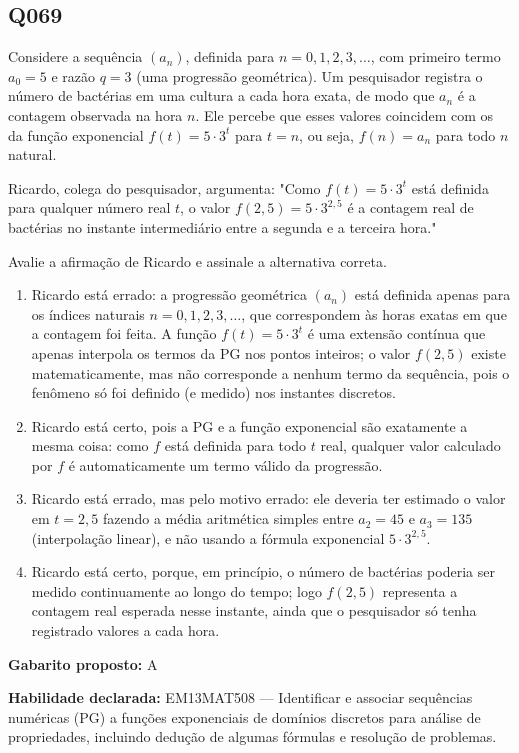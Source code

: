 \documentclass[11pt,a4paper]{article}
\begin{document}
\begin{samepage}
\subsection*{Q069}
Considere a sequência $(a_n)$, definida para $n = 0, 1, 2, 3, \ldots$, com primeiro termo $a_0 = 5$ e razão $q = 3$ (uma progressão geométrica). Um pesquisador registra o número de bactérias em uma cultura a cada hora exata, de modo que $a_n$ é a contagem observada na hora $n$. Ele percebe que esses valores coincidem com os da função exponencial $f(t) = 5 \cdot 3^t$ para $t = n$, ou seja, $f(n) = a_n$ para todo $n$ natural.

Ricardo, colega do pesquisador, argumenta: "Como $f(t)=5\cdot 3^t$ está definida para qualquer número real $t$, o valor $f(2{,}5) = 5\cdot 3^{2{,}5}$ é a contagem real de bactérias no instante intermediário entre a segunda e a terceira hora."

Avalie a afirmação de Ricardo e assinale a alternativa correta.
\begin{enumerate}[label=(\alph*),nosep,leftmargin=*]
\item Ricardo está errado: a progressão geométrica $(a_n)$ está definida apenas para os índices naturais $n=0,1,2,3,\ldots$, que correspondem às horas exatas em que a contagem foi feita. A função $f(t)=5\cdot3^t$ é uma extensão contínua que apenas interpola os termos da PG nos pontos inteiros; o valor $f(2{,}5)$ existe matematicamente, mas não corresponde a nenhum termo da sequência, pois o fenômeno só foi definido (e medido) nos instantes discretos.
\item Ricardo está certo, pois a PG e a função exponencial são exatamente a mesma coisa: como $f$ está definida para todo $t$ real, qualquer valor calculado por $f$ é automaticamente um termo válido da progressão.
\item Ricardo está errado, mas pelo motivo errado: ele deveria ter estimado o valor em $t=2{,}5$ fazendo a média aritmética simples entre $a_2=45$ e $a_3=135$ (interpolação linear), e não usando a fórmula exponencial $5\cdot3^{2,5}$.
\item Ricardo está certo, porque, em princípio, o número de bactérias poderia ser medido continuamente ao longo do tempo; logo $f(2{,}5)$ representa a contagem real esperada nesse instante, ainda que o pesquisador só tenha registrado valores a cada hora.
\end{enumerate}

\textbf{Gabarito proposto:} A

\textbf{Habilidade declarada:} EM13MAT508 --- Identificar e associar sequências numéricas (PG) a funções exponenciais de domínios discretos para análise de propriedades, incluindo dedução de algumas fórmulas e resolução de problemas.
\end{samepage}
\end{document}
